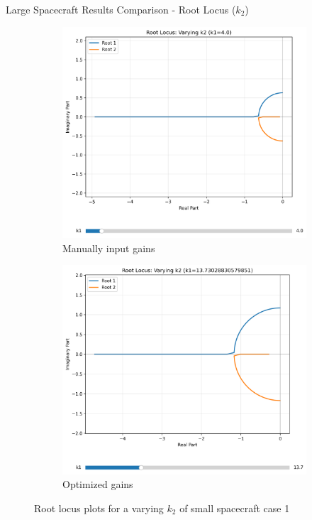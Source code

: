 \documentclass{beamer}
\begin{document}
\begin{frame}{Large Spacecraft Results Comparison - Root Locus ($k_2$)}
    \begin{figure}[H]
    \label{Fig. 1}
    \centering
    \begin{subfigure}[b]{0.48\columnwidth}
        \label{Fig. 1.A}
        \centering
        \includegraphics[width=\linewidth]{base_k2_root_locus(4).pdf}
        \caption{Manually input gains}
        \label{fig:subfig1}
    \end{subfigure}
    \hfill
    \begin{subfigure}[b]{0.48\columnwidth}
        \label{Fig. 1.B}
        \centering
        \includegraphics[width=\linewidth]{best_k2_root_locus(4).pdf}
        \caption{Optimized gains}
        \label{fig:subfig2}
    \end{subfigure}
    \caption{Root locus plots for a varying $k_2$ of small spacecraft case 1}
    \label{fig:combined}
\end{figure}
\end{frame}
\end{document}
